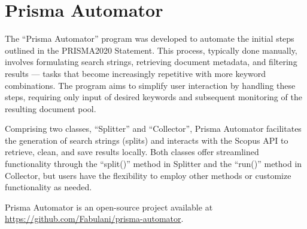 \chapter{Prisma Automator}\label{chap:Prisma Automator}

The ``Prisma Automator'' program was developed to automate the initial steps outlined in the PRISMA2020 Statement\cite{prismastatement}. This process, typically done manually, involves formulating search strings, retrieving document metadata, and filtering results — tasks that become increasingly repetitive with more keyword combinations. The program aims to simplify user interaction by handling these steps, requiring only input of desired keywords and subsequent monitoring of the resulting document pool.

Comprising two classes, ``Splitter'' and ``Collector'', Prisma Automator facilitates the generation of search strings (splits) and interacts with the Scopus API to retrieve, clean, and save results locally. Both classes offer streamlined functionality through the ``split()'' method in Splitter and the ``run()'' method in Collector, but users have the flexibility to employ other methods or customize functionality as needed. 

Prisma Automator is an open-source project available at \url{https://github.com/Fabulani/prisma-automator}.

